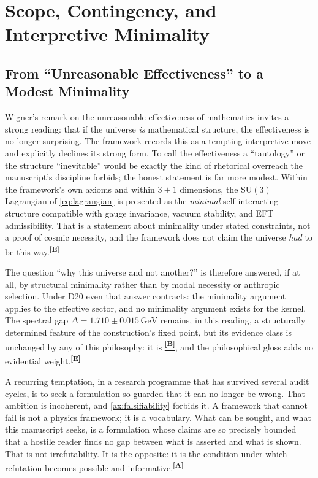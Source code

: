 \documentclass[12pt,a4paper,twoside]{article}
\theoremstyle{plain}
\theoremstyle{definition}
\theoremstyle{remark}
\newcommand{\GeV}{\,\mathrm{GeV}}
\newcommand{\catmark}[1]{\textsuperscript{\textsf{\textbf{[#1]}}}}
\newcommand{\Bdelta}{\hyperref[box:pi-override-delta]{\catmark{B}}}
\newcommand{\DeltaGap}{1.710 \pm 0.015\GeV} %
\begin{document}
\section{Scope, Contingency, and Interpretive Minimality}
\label{sec:inevitability-sociology}

\subsection{From ``Unreasonable Effectiveness'' to a Modest Minimality}
\label{subsec:inevitability}

Wigner's remark on the unreasonable effectiveness of mathematics invites
a strong reading: that if the universe \emph{is} mathematical structure,
the effectiveness is no longer surprising. The framework records this as
a tempting interpretive move and explicitly declines its strong form. To
call the effectiveness a ``tautology'' or the structure ``inevitable''
would be exactly the kind of rhetorical overreach the manuscript's
discipline forbids; the honest statement is far more modest. Within the
framework's own axioms and within $3+1$ dimensions, the $\mathrm{SU}(3)$
Lagrangian of \cref{eq:lagrangian} is presented as the \emph{minimal}
self-interacting structure compatible with gauge invariance, vacuum
stability, and EFT admissibility. That is a statement about minimality
under stated constraints, not a proof of cosmic necessity, and the
framework does not claim the universe \emph{had} to be this
way.\catmark{E}

The question ``why this universe and not another?'' is therefore
answered, if at all, by structural minimality rather than by modal
necessity or anthropic selection. Under D20 even that answer contracts:
the minimality argument applies to the effective sector, and no
minimality argument exists for the kernel. The spectral gap
$\Delta = \DeltaGap$ remains, in this reading, a structurally determined
feature of the construction's fixed point, but its evidence class is
unchanged by any of this philosophy: it is \Bdelta, and the philosophical
gloss adds no evidential weight.\catmark{E}

\begin{governancebox}
\label{gov:irrefutable}
A recurring temptation, in a research programme that has survived several
audit cycles, is to seek a formulation so guarded that it can no longer
be wrong. That ambition is incoherent, and \cref{ax:falsifiability}
forbids it. A framework that cannot fail is not a physics framework; it
is a vocabulary. What can be sought, and what this manuscript seeks, is a
formulation whose claims are so precisely bounded that a hostile reader
finds no gap between what is asserted and what is shown. That is not
irrefutability. It is the opposite: it is the condition under which
refutation becomes possible and informative.\catmark{A}
\end{governancebox}
\end{document}
